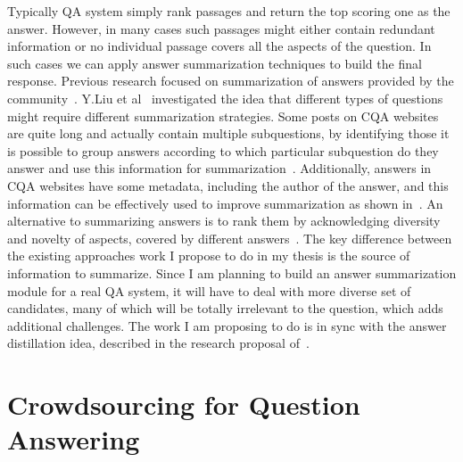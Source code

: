 Typically QA system simply rank passages and return the top scoring one as the answer.
However, in many cases such passages might either contain redundant information or no individual passage covers all the aspects of the question.
In such cases we can apply answer summarization techniques to build the final response.
Previous research focused on summarization of answers provided by the community~\cite{liu2008understanding,tomasoni2010metadata,pande2013summarizing,chan2012community,zhaochun_sparsecoding_2016}.
Y.Liu et al~\cite{liu2008understanding} investigated the idea that different types of questions might require different summarization strategies.
Some posts on CQA websites are quite long and actually contain multiple subquestions, by identifying those it is possible to group answers according to which particular subquestion do they answer and use this information for summarization~\cite{chan2012community,pande2013summarizing}.
Additionally, answers in CQA websites have some metadata, including the author of the answer, and this information can be effectively used to improve summarization as shown in~\cite{tomasoni2010metadata}.
An alternative to summarizing answers is to rank them by acknowledging diversity and novelty of aspects, covered by different answers~\cite{omari2016novelty}.
The key difference between the existing approaches work I propose to do in my thesis is the source of information to summarize.
Since I am planning to build an answer summarization module for a real QA system, it will have to deal with more diverse set of candidates, many of which will be totally irrelevant to the question, which adds additional challenges.
The work I am proposing to do is in sync with the answer distillation idea, described in the research proposal of~\cite{mitra2016distillation}.


\section{Crowdsourcing for Question Answering}
\label{section:relatedework:crowdsourcing}

